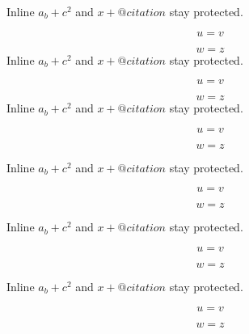Inline $a_b + c^2$ and \(x + @citation\) stay protected.

\[
u = v
\]

\[
w = z
\]
Inline $a_b + c^2$ and \(x + @citation\) stay protected.

\[
u = v
\]

\[
w = z
\]
Inline $a_b + c^2$ and \(x + @citation\) stay protected.

\[
u = v
\]

\[
w = z
\]
\begin{frame}[t]
Inline $a_b + c^2$ and \(x + @citation\) stay protected.

\[
u = v
\]

\[
w = z
\]
\end{frame}

\begin{frame}[t]
Inline $a_b + c^2$ and \(x + @citation\) stay protected.

\[
u = v
\]

\[
w = z
\]
\end{frame}

\begin{frame}[t]
Inline $a_b + c^2$ and \(x + @citation\) stay protected.

\[
u = v
\]

\[
w = z
\]
\end{frame}

